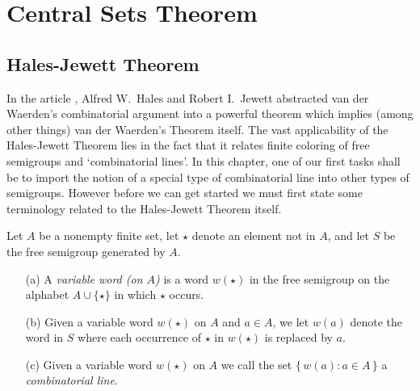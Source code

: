 %

\chapter{Central Sets Theorem}

\section{Hales-Jewett Theorem}
In the article \cite{Hales:1963fk}, Alfred W.~Hales and Robert I.~Jewett abstracted van der Waerden's combinatorial argument into a powerful theorem which implies (among other things) van der Waerden's Theorem itself. 
The vast applicability of the Hales-Jewett Theorem lies in the fact that it relates finite coloring of free semigroups and `combinatorial lines'. 
In this chapter, one of our first tasks shall be to import the notion of a special type of combinatorial line into other types of semigroups. 
However before we can get started we must first state some terminology related to the Hales-Jewett Theorem itself.

\begin{defn}
  Let $A$ be a nonempty finite set, let $\star$ denote an element not in $A$, and let $S$ be the free semigroup generated by $A$.
  \begin{itemize}
    \item[(a)] 
      A \emph{variable word (on $A$)} is a word $w(\star)$ in the free semigroup on the alphabet $A \cup \{\star\}$ in which $\star$ occurs.

    \item[(b)] 
      Given a variable word $w(\star)$ on $A$ and $a \in A$, we let $w(a)$ denote the word in $S$ where each occurrence of $\star$ in $w(\star)$ is replaced by $a$.

    \item[(c)] 
      Given a variable word $w(\star)$ on $A$ we call the set $\{\, w(a) : a \in A \,\}$ a \emph{combinatorial line}.
  \end{itemize}
\end{defn}

